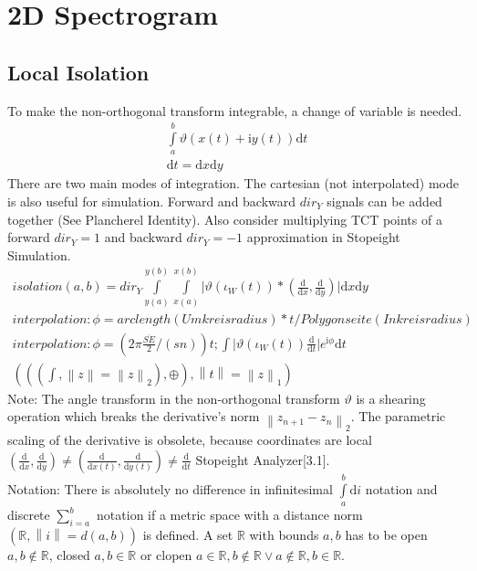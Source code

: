 \documentclass{report}
\newcommand\norm[1]{\left\lVert#1\right\rVert}
\begin{document}
\section{2D Spectrogram}
\subsection{Local Isolation}
To make the non-orthogonal transform integrable, a change of variable is needed.
\begin{align}
\int \limits _{a}^{b} \vartheta (x(t)+\mathrm{i}y(t)) \mathrm{d}t\\
\mathrm{d} t = \mathrm{d}x \mathrm{d}y
\end{align}
There are two main modes of integration. The cartesian (not interpolated) mode is also useful for simulation. Forward and backward $dir_{Y}$ signals can be added together (See Plancherel Identity). Also consider multiplying TCT points of a forward $dir_{Y}=1$ and backward $dir_{Y}=-1$ approximation in Stopeight Simulation.
\begin{align}
isolation(a,b)= dir_{Y}\int \limits _{y(a)}^{y(b)} \int \limits _{x(a)}^{x(b)} \lvert \vartheta (\iota_{W} (t))*(\frac{\mathrm{d}}{\mathrm{d}x},\frac{\mathrm{d}}{\mathrm{d}y})\rvert \mathrm{d}x\mathrm{d}y\\
interpolation: \phi = arclength(Umkreisradius)*t/Polygonseite(Inkreisradius)\\
interpolation: \phi = (2\pi\frac{\overline{SE}}{2}/(sn))t;\int \lvert \vartheta (\iota_{W} (t))\frac{\mathrm{d}}{\mathrm{d}t} \rvert e^{\mathrm{i}\phi}\mathrm{d}t\\
(((\int,\norm{z}=\norm{z}_2),\oplus),\norm{t}=\norm{z}_1)
\end{align}
Note: The angle transform in the non-orthogonal transform $\vartheta$ is a shearing operation which breaks the derivative's norm $\norm{z_{n+1}-z_{n}}_2$. The parametric scaling of the derivative is obsolete, because coordinates are local $(\frac{\mathrm{d}}{\mathrm{d} x},\frac{\mathrm{d}}{\mathrm{d} y})\not =(\frac{\mathrm{d}}{\mathrm{d} x(t)},\frac{\mathrm{d}}{\mathrm{d} y(t)})\not = \frac{\mathrm{d}}{\mathrm{d}t}$ Stopeight Analyzer\cite{Analyzer}[3.1].\\
Notation: There is absolutely no difference in infinitesimal $\int \limits _{a}^{b} \mathrm{d}i$ notation and discrete $\sum  \limits _{i=a}^{b}$ notation if a metric space with a distance norm $(\mathbb{R},\norm{i}=d(a,b))$ is defined. A set $\mathbb{R}$ with bounds $a,b$ has to be open $a,b \not \in \mathbb{R}$, closed $a,b \in \mathbb{R}$ or clopen $a \in \mathbb{R}, b \not \in \mathbb{R} \lor a \not \in \mathbb{R},b \in \mathbb{R}$.\\\\
\end{document}
